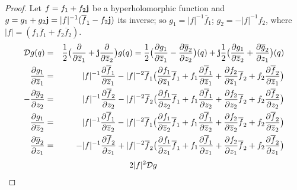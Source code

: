 \documentclass[12pt]{amsart}
\theoremstyle{definition}
\begin{document}
\begin{proof}
Let $f=f_1+f_2{\bf j}$ be a hyperholomorphic function and $g=g_1+g_2{\bf j}=\displaystyle \vert f\vert^{-1}(\overline f_1-f_2{\bf j})$ its inverse; so $g_1=\vert f\vert^{-1}\overline f_1$; $g_2=-\vert f\vert^{-1}f_2$, 
where $\vert f\vert=(f_1\overline f_1+f_2\overline f_2)$.
\begin{eqnarray*}
{\mathcal D}g(q)&=&\frac{1}{2}\big(\frac{\partial}{\partial\overline z_1}
+{\bf j}\frac{\partial}{\partial\overline z_2}\big) g(q)
=\frac{1}{2}\big({\frac{\partial
g_1}{\partial\overline z_1}-\frac{\partial\overline g_2}{\partial z_2}}\big)
(q)+{\bf j}\frac{1}{2}\big({\frac{\partial g_1}{\partial\overline
z_2}+\frac{\partial\overline g_2}{\partial z_1}}\big) (q)
\\
\frac{\partial g_1}{\partial\overline z_1}&=& \vert f\vert^{-1}\frac{\partial\overline f_1}{\partial \overline z_1}-\vert f\vert^{-2} \overline f_1\big(\frac{\partial f_1}{\partial \overline z_1}\overline f_1+f_1\frac{\partial\overline f_1}{\partial\overline z_1}+\frac{\partial f_2}{\partial \overline z_1}\overline f_2+f_2\frac{\partial\overline f_2}{\partial \overline z_1}\big)
\\
-\frac{\partial\overline g_2}{\partial z_2}&=& \vert f\vert^{-1}\frac{\partial\overline f_2}{\partial z_2}-\vert f\vert^{-2} \overline f_2\big(\frac{\partial f_1}{\partial z_2}\overline f_1+f_1\frac{\partial\overline f_1}{\partial z_2}+\frac{\partial f_2}{\partial z_2}\overline f_2+f_2\frac{\partial\overline f_2}{\partial z_2}\big)
\\
\frac{\partial g_1}{\partial\overline z_2}&=& \vert f\vert^{-1}\frac{\partial\overline f_1}{\partial \overline z_2}-\vert f\vert^{-2} \overline f_1\big(\frac{\partial f_1}{\partial \overline z_2}\overline f_1+f_1\frac{\partial\overline f_1}{\partial \overline z_2}+\frac{\partial f_2}{\partial \overline z_2}\overline f_2+f_2\frac{\partial\overline f_2}{\partial \overline z_2}\big)
\\
\frac{\partial\overline g_2}{\partial z_1}&=& - \vert f\vert^{-1}\frac{\partial\overline f_2}{\partial z_1}+\vert f\vert^{-2} \overline f_2\big(\frac{\partial f_1}{\partial z_1}\overline f_1+f_1\frac{\partial\overline f_1}{\partial z_1}+\frac{\partial f_2}{\partial z_1}\overline f_2+f_2\frac{\partial\overline f_2}{\partial z_1}\big)
\end{eqnarray*}
\begin{eqnarray*}
&&\hspace*{-36pt}2\vert f\vert^2{\mathcal D}g
\\

\end{eqnarray*}
\end{proof}
\end{document}
